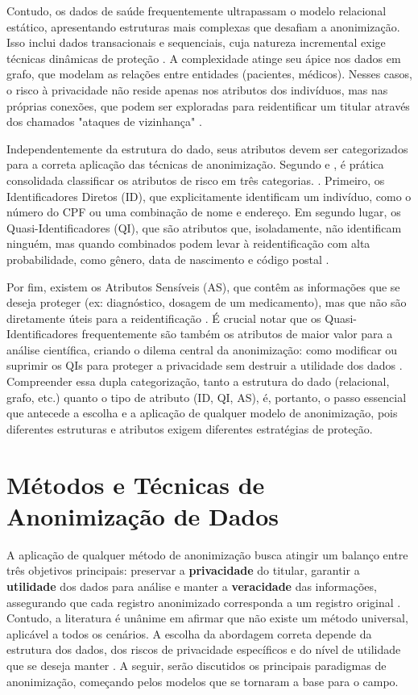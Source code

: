 Contudo, os dados de saúde frequentemente ultrapassam o modelo relacional estático, apresentando estruturas mais complexas que desafiam a anonimização. Isso inclui dados transacionais e sequenciais, cuja natureza incremental exige técnicas dinâmicas de proteção \cite{Zuo2021Data, Olatunji2024}. A complexidade atinge seu ápice nos dados em grafo, que modelam as relações entre entidades (pacientes, médicos). Nesses casos, o risco à privacidade não reside apenas nos atributos dos indivíduos, mas nas próprias conexões, que podem ser exploradas para reidentificar um titular através dos chamados "ataques de vizinhança" \cite{Olatunji2024}.

Independentemente da estrutura do dado, seus atributos devem ser categorizados para a correta aplicação das técnicas de anonimização. Segundo  e , é prática consolidada classificar os atributos de risco em três categorias. . Primeiro, os Identificadores Diretos (ID), que explicitamente identificam um indivíduo, como o número do CPF ou uma combinação de nome e endereço. Em segundo lugar, os Quasi-Identificadores (QI), que são atributos que, isoladamente, não identificam ninguém, mas quando combinados podem levar à reidentificação com alta probabilidade, como gênero, data de nascimento e código postal \cite{Zuo2021Data, Olatunji2024}.

Por fim, existem os Atributos Sensíveis (AS), que contêm as informações que se deseja proteger (ex: diagnóstico, dosagem de um medicamento), mas que não são diretamente úteis para a reidentificação \cite{Zuo2021Data}. É crucial notar que os Quasi-Identificadores frequentemente são também os atributos de maior valor para a análise científica, criando o dilema central da anonimização: como modificar ou suprimir os QIs para proteger a privacidade sem destruir a utilidade dos dados \cite{Zuo2021Data}. Compreender essa dupla categorização, tanto a estrutura do dado (relacional, grafo, etc.) quanto o tipo de atributo (ID, QI, AS), é, portanto, o passo essencial que antecede a escolha e a aplicação de qualquer modelo de anonimização, pois diferentes estruturas e atributos exigem diferentes estratégias de proteção.

\section{Métodos e Técnicas de Anonimização de Dados}
\label{sec:fund-metodos-anon}

A aplicação de qualquer método de anonimização busca atingir um balanço entre três objetivos principais: preservar a \textbf{privacidade} do titular, garantir a \textbf{utilidade} dos dados para análise e manter a \textbf{veracidade} das informações, assegurando que cada registro anonimizado corresponda a um registro original \cite{Olatunji2024}. Contudo, a literatura é unânime em afirmar que não existe um método universal, aplicável a todos os cenários. A escolha da abordagem correta depende da estrutura dos dados, dos riscos de privacidade específicos e do nível de utilidade que se deseja manter \cite{Vovk2023}. A seguir, serão discutidos os principais paradigmas de anonimização, começando pelos modelos que se tornaram a base para o campo.

